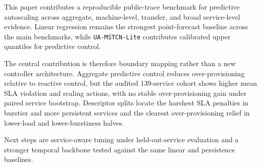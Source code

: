 This paper contributes a reproducible public-trace benchmark for predictive autoscaling across aggregate, machine-level, transfer, and broad service-level evidence. Linear regression remains the strongest point-forecast baseline across the main benchmarks, while \texttt{UA-MSTCN-Lite} contributes calibrated upper quantiles for predictive control.

The central contribution is therefore boundary mapping rather than a new controller architecture. Aggregate predictive control reduces over-provisioning relative to reactive control, but the audited 139-service cohort shows higher mean SLA violation and scaling actions, with no stable over-provisioning gain under paired service bootstrap. Descriptor splits locate the harshest SLA penalties in burstier and more persistent services and the clearest over-provisioning relief in lower-load and lower-burstiness halves.

Next steps are service-aware tuning under held-out-service evaluation and a stronger temporal backbone tested against the same linear and persistence baselines.

